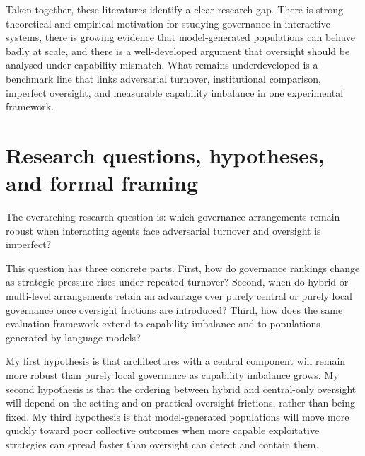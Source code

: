 \documentclass[10pt]{article}
\begin{document}
Taken together, these literatures identify a clear research gap. There is strong theoretical and empirical motivation for studying governance in interactive systems, there is growing evidence that model-generated populations can behave badly at scale, and there is a well-developed argument that oversight should be analysed under capability mismatch. What remains underdeveloped is a benchmark line that links adversarial turnover, institutional comparison, imperfect oversight, and measurable capability imbalance in one experimental framework.

\section{Research questions, hypotheses, and formal framing}

The overarching research question is: which governance arrangements remain robust when interacting agents face adversarial turnover and oversight is imperfect?

This question has three concrete parts. First, how do governance rankings change as strategic pressure rises under repeated turnover? Second, when do hybrid or multi-level arrangements retain an advantage over purely central or purely local governance once oversight frictions are introduced? Third, how does the same evaluation framework extend to capability imbalance and to populations generated by language models?

My first hypothesis is that architectures with a central component will remain more robust than purely local governance as capability imbalance grows. My second hypothesis is that the ordering between hybrid and central-only oversight will depend on the setting and on practical oversight frictions, rather than being fixed. My third hypothesis is that model-generated populations will move more quickly toward poor collective outcomes when more capable exploitative strategies can spread faster than oversight can detect and contain them.
\end{document}
